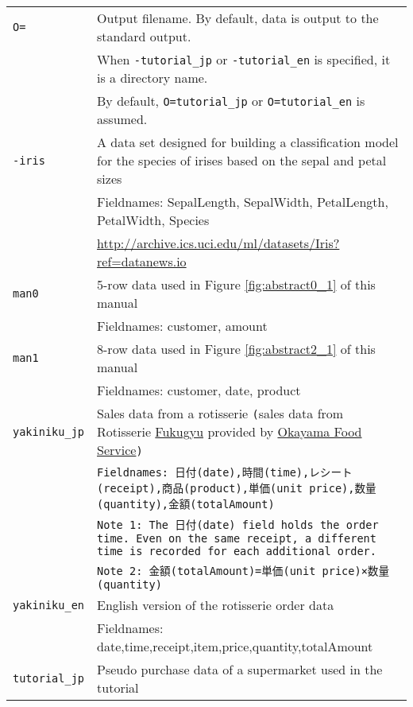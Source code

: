 \begin{table}[htbp]
{\small
\begin{tabular}{ll}
\verb|O=|    & Output filename. By default, data is output to the standard output.\\
             & When \verb|-tutorial_jp| or \verb|-tutorial_en| is specified, it is a directory name.\\
             & By default, \verb|O=tutorial_jp| or \verb|O=tutorial_en| is assumed.\\
\verb|-iris| & A data set designed for building a classification model for the species of irises based on the sepal and petal sizes\\
             & Fieldnames: SepalLength, SepalWidth, PetalLength, PetalWidth, Species\\
             & \href{http://archive.ics.uci.edu/ml/datasets/Iris?ref=datanews.io}{http://archive.ics.uci.edu/ml/datasets/Iris?ref=datanews.io} \\
\verb|man0|  & 5-row data used in Figure \ref{fig:abstract0_1} of this manual\\
             & Fieldnames: customer, amount\\
\verb|man1|  & 8-row data used in Figure \ref{fig:abstract2_1} of this manual\\
             & Fieldnames: customer, date, product\\
\verb|yakiniku_jp| & Sales data from a rotisserie \verb|(|sales data from Rotisserie \href{https://r.gnavi.co.jp/c032802/}{Fukugyu} provided by \href{http://okayamafs.com/}{Okayama Food Service}\verb|)|\\
                   & \verb|Fieldnames: 日付(date),時間(time),レシート(receipt),商品(product),単価(unit price),数量(quantity),金額(totalAmount)|\\
                   & \verb|Note 1: The 日付(date) field holds the order time. Even on the same receipt, a different time is recorded for each additional order.|\\
                   & \verb|Note 2: 金額(totalAmount)=単価(unit price)×数量(quantity)|\\
\verb|yakiniku_en| & English version of the rotisserie order data\\
                   & Fieldnames: date,time,receipt,item,price,quantity,totalAmount \\
\verb|tutorial_jp| & Pseudo purchase data of a supermarket used in the tutorial\\

\end{tabular}}
\end{table}
